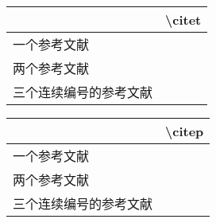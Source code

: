 ﻿\documentclass{article}
\begin{document}
    \vspace{2ex}

    \begin{tabular}{ll}
        \toprule
        &\textbackslash{}citet\\
        \midrule
        一个参考文献&\citet{author1.2001}\\
        两个参考文献&\citet{author1.2001,author2.2002}\\
        三个连续编号的参考文献&\citet{author2.2002,author3.2003,author4.2004}\\
        \bottomrule
    \end{tabular}

    \vspace{2ex}

    \begin{tabular}{ll}
        \toprule
        &\textbackslash{}citep\\
        \midrule
        一个参考文献&\citep{author1.2001}\\
        两个参考文献&\citep{author2.2002,author3.2003}\\
        三个连续编号的参考文献&\citep{author2.2002,author3.2003,author4.2004}\\
        \bottomrule
    \end{tabular}
\end{document}
